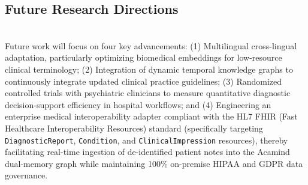 \documentclass[10pt]{SPIIRAS_Proceedings}
\begin{document}
\subsection{Future Research Directions}~\\
\hspace*{\parindent}Future work will focus on four key advancements: (1) Multilingual cross-lingual adaptation, particularly optimizing biomedical embeddings for low-resource clinical terminology; (2) Integration of dynamic temporal knowledge graphs to continuously integrate updated clinical practice guidelines; (3) Randomized controlled trials with psychiatric clinicians to measure quantitative diagnostic decision-support efficiency in hospital workflows; and (4) Engineering an enterprise medical interoperability adapter compliant with the HL7 FHIR (Fast Healthcare Interoperability Resources) standard (specifically targeting \texttt{DiagnosticReport}, \texttt{Condition}, and \texttt{ClinicalImpression} resources), thereby facilitating real-time ingestion of de-identified patient notes into the Acamind dual-memory graph while maintaining 100\% on-premise HIPAA and GDPR data governance.
\end{document}
